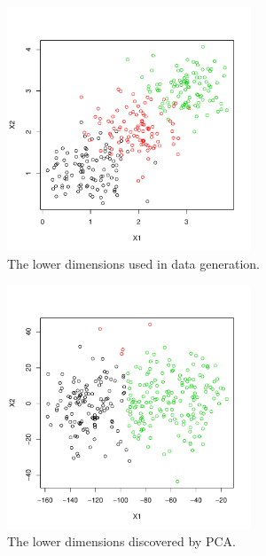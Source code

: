 \documentclass[12pt]{article}
\begin{document}
\begin{figure}[H]
  \begin{subfigure}[b]{0.32\textwidth}
 \includegraphics[width=0.8\textwidth]{pics/simX}
  \caption{The lower dimensions used in data generation.}
\end{subfigure}
  \hfill
   \begin{subfigure}[b]{0.32\textwidth}
 \includegraphics[width=0.8\textwidth]{pics/simPCAX}
  \caption{The lower dimensions discovered by PCA.}
\end{subfigure}
  \hfill
 \begin{subfigure}[b]{0.32\textwidth}

\end{subfigure}
\end{figure}
\end{document}
